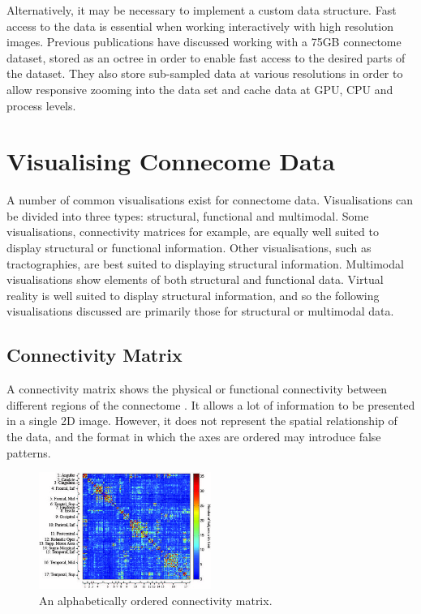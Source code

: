 \documentclass[MSc,paper=a4,pagesize=auto]{icldt}
\begin{document}
Alternatively, it may be necessary to implement a custom data structure. Fast access to the data is essential when working interactively with high resolution images. Previous publications \cite{Jeong2010} have discussed working with a 75GB connectome dataset, stored as an octree in order to enable fast access to the desired parts of the dataset. They also store sub-sampled data at various resolutions in order to allow responsive zooming into the data set and cache data at GPU, CPU and process levels. 

\section{Visualising Connecome Data}
A number of common visualisations exist for connectome data. Visualisations can be divided into three types: structural, functional and multimodal. Some visualisations, connectivity matrices for example, are equally well suited to display structural or functional information. Other visualisations, such as tractographies, are best suited to displaying structural information. Multimodal visualisations show elements of both structural and functional data. Virtual reality is well suited to display structural information, and so the following visualisations discussed are primarily those for structural or multimodal data.

\subsection{Connectivity Matrix}
A connectivity matrix shows the physical or functional connectivity between different regions of the connectome \cite{Wang2011}. It allows a lot of information to be presented in a single 2D image. However, it does not represent the spatial relationship of the data, and the format in which the axes are ordered may introduce false patterns. 

\begin{figure}[htbp!]
    \centering
    \includegraphics[width=0.5\textwidth]{resources/connectivity_matrix}
    \caption{An alphabetically ordered connectivity matrix. \cite{Wang2011}}
    \label{fig:connectivity_matrix}
\end{figure}
\end{document}
